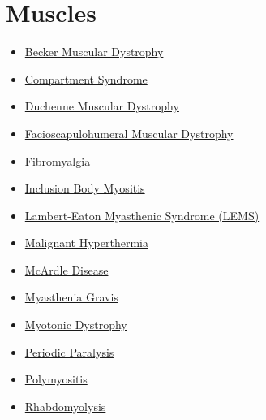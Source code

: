 \section*{Muscles}
\label{sec:organ_muscles}
\begin{itemize}[noitemsep]
  \item \hyperlink{sec:Becker Muscular Dystrophy}{Becker Muscular Dystrophy}
  \item \hyperlink{sec:Compartment Syndrome}{Compartment Syndrome}
  \item \hyperlink{sec:Duchenne Muscular Dystrophy}{Duchenne Muscular Dystrophy}
  \item \hyperlink{sec:Facioscapulohumeral Muscular Dystrophy}{Facioscapulohumeral Muscular Dystrophy}
  \item \hyperlink{sec:Fibromyalgia}{Fibromyalgia}
  \item \hyperlink{sec:Inclusion Body Myositis}{Inclusion Body Myositis}
  \item \hyperlink{sec:Lambert-Eaton Myasthenic Syndrome (LEMS)}{Lambert-Eaton Myasthenic Syndrome (LEMS)}
  \item \hyperlink{sec:Malignant Hyperthermia}{Malignant Hyperthermia}
  \item \hyperlink{sec:McArdle Disease}{McArdle Disease}
  \item \hyperlink{sec:Myasthenia Gravis}{Myasthenia Gravis}
  \item \hyperlink{sec:Myotonic Dystrophy}{Myotonic Dystrophy}
  \item \hyperlink{sec:Periodic Paralysis}{Periodic Paralysis}
  \item \hyperlink{sec:Polymyositis}{Polymyositis}
  \item \hyperlink{sec:Rhabdomyolysis}{Rhabdomyolysis}
\end{itemize}

